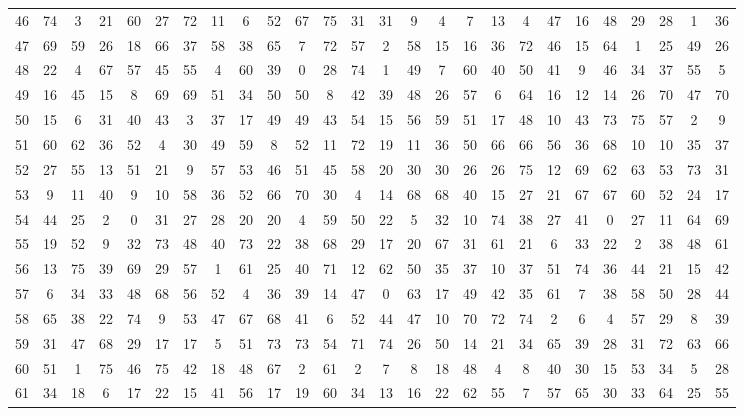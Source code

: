 \begin{table}
\begin{tabular}{c c c c c c c c c c c c c c c c c c c c c c c c c c }
46 & 74 & 3 & 21 & 60 & 27 & 72 & 11 & 6 & 52 & 67 & 75 & 31 & 31 & 9 & 4 & 7 & 13 & 4 & 47 & 16 & 48 & 29 & 28 & 1 & 36 \\
47 & 69 & 59 & 26 & 18 & 66 & 37 & 58 & 38 & 65 & 7 & 72 & 57 & 2 & 58 & 15 & 16 & 36 & 72 & 46 & 15 & 64 & 1 & 25 & 49 & 26 \\
48 & 22 & 4 & 67 & 57 & 45 & 55 & 4 & 60 & 39 & 0 & 28 & 74 & 1 & 49 & 7 & 60 & 40 & 50 & 41 & 9 & 46 & 34 & 37 & 55 & 5 \\
49 & 16 & 45 & 15 & 8 & 69 & 69 & 51 & 34 & 50 & 50 & 8 & 42 & 39 & 48 & 26 & 57 & 6 & 64 & 16 & 12 & 14 & 26 & 70 & 47 & 70 \\
50 & 15 & 6 & 31 & 40 & 43 & 3 & 37 & 17 & 49 & 49 & 43 & 54 & 15 & 56 & 59 & 51 & 17 & 48 & 10 & 43 & 73 & 75 & 57 & 2 & 9 \\
51 & 60 & 62 & 36 & 52 & 4 & 30 & 49 & 59 & 8 & 52 & 11 & 72 & 19 & 11 & 36 & 50 & 66 & 66 & 56 & 36 & 68 & 10 & 10 & 35 & 37 \\
52 & 27 & 55 & 13 & 51 & 21 & 9 & 57 & 53 & 46 & 51 & 45 & 58 & 20 & 30 & 30 & 26 & 26 & 75 & 12 & 69 & 62 & 63 & 53 & 73 & 31 \\
53 & 9 & 11 & 40 & 9 & 10 & 58 & 36 & 52 & 66 & 70 & 30 & 4 & 14 & 68 & 68 & 40 & 15 & 27 & 21 & 67 & 67 & 60 & 52 & 24 & 17 \\
54 & 44 & 25 & 2 & 0 & 31 & 27 & 28 & 20 & 20 & 4 & 59 & 50 & 22 & 5 & 32 & 10 & 74 & 38 & 27 & 41 & 0 & 27 & 11 & 64 & 69 \\
55 & 19 & 52 & 9 & 32 & 73 & 48 & 40 & 73 & 22 & 38 & 68 & 29 & 17 & 20 & 67 & 31 & 61 & 21 & 6 & 33 & 22 & 2 & 38 & 48 & 61 \\
56 & 13 & 75 & 39 & 69 & 29 & 57 & 1 & 61 & 25 & 40 & 71 & 12 & 62 & 50 & 35 & 37 & 10 & 37 & 51 & 74 & 36 & 44 & 21 & 15 & 42 \\
57 & 6 & 34 & 33 & 48 & 68 & 56 & 52 & 4 & 36 & 39 & 14 & 47 & 0 & 63 & 17 & 49 & 42 & 35 & 61 & 7 & 38 & 58 & 50 & 28 & 44 \\
58 & 65 & 38 & 22 & 74 & 9 & 53 & 47 & 67 & 68 & 41 & 6 & 52 & 44 & 47 & 10 & 70 & 72 & 74 & 2 & 6 & 4 & 57 & 29 & 8 & 39 \\
59 & 31 & 47 & 68 & 29 & 17 & 17 & 5 & 51 & 73 & 73 & 54 & 71 & 74 & 26 & 50 & 14 & 21 & 34 & 65 & 39 & 28 & 31 & 72 & 63 & 66 \\
60 & 51 & 1 & 75 & 46 & 75 & 42 & 18 & 48 & 67 & 2 & 61 & 2 & 7 & 8 & 18 & 48 & 4 & 8 & 40 & 30 & 15 & 53 & 34 & 5 & 28 \\
61 & 34 & 18 & 6 & 17 & 22 & 15 & 41 & 56 & 17 & 19 & 60 & 34 & 13 & 16 & 22 & 62 & 55 & 7 & 57 & 65 & 30 & 33 & 64 & 25 & 55 \\

\end{tabular}
\end{table}
